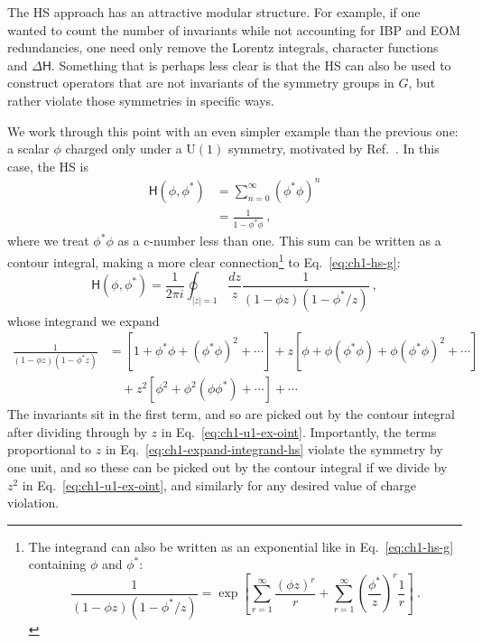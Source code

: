 The HS approach has an attractive modular structure. For example, if one wanted
to count the number of invariants while not accounting for IBP and EOM
redundancies, one need only remove the Lorentz integrals, character functions
and $\Delta \mathsf{H}$. Something that is perhaps less clear is that the HS
can also be used to construct operators that are not invariants of the symmetry
groups in $G$, but rather violate those symmetries in specific ways.

We work through this point with an even simpler example than the previous one: a
scalar $\phi$ charged only under a $\mathrm{U}(1)$ symmetry, motivated by
Ref.~\cite{Lehman:2015via}. In this case, the HS is
\begin{align}
  \mathsf{H}(\phi, \phi^{*}) &= \sum_{n=0}^{\infty} (\phi^{*}\phi)^{n} \\
                               &= \frac{1}{1 - \phi^{*} \phi} \ ,
\end{align}
where we treat $\phi^{*}\phi$ as a c-number less than one. This sum can be
written as a contour integral, making a more clear connection\footnote{The
  integrand can also be written as an exponential like in Eq.~\eqref{eq:ch1-hs-g}
  containing $\phi$ and $\phi^{*}$:
  \begin{equation*}
    \frac{1}{(1 - \phi z)(1 - \phi^{*}/z)} = \exp \left[ \sum_{r=1}^{\infty} \frac{(\phi z)^{r}}{r} + \sum_{r=1}^{\infty} \left(\frac{\phi^{*}}{z}\right)^{r}\frac{1}{r} \right] \ .
  \end{equation*}} to
Eq.~\eqref{eq:ch1-hs-g}:
\begin{equation}
  \label{eq:ch1-u1-ex-oint}
  \mathsf{H}(\phi, \phi^{*}) = \frac{1}{2\pi i} \oint_{|z|=1} \frac{dz}{z} \frac{1}{(1 - \phi z)(1 - \phi^{*}/z)} \ ,
\end{equation}
whose integrand we expand
\begin{equation}
  \label{eq:ch1-expand-integrand-hs}
  \begin{aligned}
    \frac{1}{(1 - \phi z)(1 - \phi^{*} z)} &= [1 + \phi^{*}\phi + (\phi^{*}\phi)^{2} + \cdots] + z [\phi + \phi (\phi^{*}\phi) + \phi(\phi^{*}\phi)^{2} + \cdots] \\
    &\quad + z^2 [\phi^2 + \phi^2 (\phi \phi^*) + \cdots] + \cdots
  \end{aligned}
\end{equation}
The invariants sit in the first term, and so are picked out by the contour
integral after dividing through by $z$ in Eq.~\eqref{eq:ch1-u1-ex-oint}.
Importantly, the terms proportional to $z$ in Eq.~\eqref{eq:ch1-expand-integrand-hs}
violate the symmetry by one unit, and so these can be picked out by the contour
integral if we divide by $z^{2}$ in Eq.~\eqref{eq:ch1-u1-ex-oint}, and similarly for
any desired value of charge violation.

